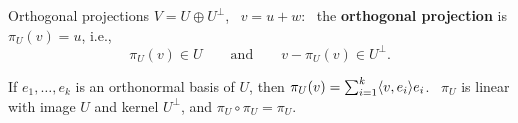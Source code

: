 \documentclass[aspectratio=1610,11pt]{beamer}
\begin{document}

\begin{frame}{Orthogonal projections}
    \small
    $V = U \oplus U^\perp$, \ $v = u + w$: \ the \textbf{orthogonal projection} is $\pi_U(v) = u$, i.e.,
    \[\pi_U(v) \in U \qquad \text{and} \qquad v - \pi_U(v) \in U^\perp.\]
    \begin{proposition}
        If $e_1, \ldots, e_k$ is an orthonormal basis of $U$, then $\pi_U(v) = \sum_{i=1}^k\langle v, e_i \rangle e_i$. \ $\pi_U$ is linear with image $U$ and kernel $U^\perp$, and $\pi_U \circ \pi_U = \pi_U$.
    \end{proposition}
\end{frame}
\end{document}
